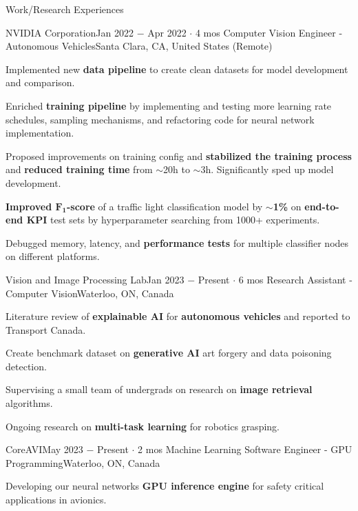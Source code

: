 \documentclass{resume}
\begin{document}
\begin{rSection}{Work/Research Experiences}

    \begin{rSubsection}{NVIDIA Corporation}{Jan 2022 \(-\) Apr 2022 \(\cdot\) 4 mos}
        {Computer Vision Engineer - Autonomous Vehicles}{Santa Clara, CA, United States (Remote)}
        \item Implemented new \textbf{data pipeline} to create clean datasets for model development and comparison.
        \item Enriched \textbf{training pipeline} by implementing and testing more learning rate schedules, sampling mechanisms, and refactoring code for neural network implementation.
        \item Proposed improvements on training config and \textbf{stabilized the training process} and \textbf{reduced training time} from \(\sim\)20h to \(\sim\)3h. Significantly sped up model development.
        \item \textbf{Improved \(\boldsymbol{F_{1}}\)-score} of a traffic light classification model by \(\sim\)\textbf{1\%} on \textbf{end-to-end KPI} test sets by hyperparameter searching from 1000+ experiments.
        \item Debugged memory, latency, and \textbf{performance tests} for multiple classifier nodes on different platforms.
    \end{rSubsection}

    \begin{rSubsection}{Vision and Image Processing Lab}{Jan 2023 \(-\) Present \(\cdot\) 6 mos}
        {Research Assistant - Computer Vision}{Waterloo, ON, Canada}
        \item Literature review of \textbf{explainable AI} for \textbf{autonomous vehicles} and reported to Transport Canada.
        \item Create benchmark dataset on \textbf{generative AI} art forgery and data poisoning detection.
        \item Supervising a small team of undergrads on research on \textbf{image retrieval} algorithms.
        \item Ongoing research on \textbf{multi-task learning} for robotics grasping.
    \end{rSubsection}

    \begin{rSubsection}{CoreAVI}{May 2023 \(-\) Present \(\cdot\) 2 mos}
        {Machine Learning Software Engineer - GPU Programming}{Waterloo, ON, Canada}
        \item Developing our neural networks \textbf{GPU inference engine} for safety critical applications in avionics.
    \end{rSubsection}


\end{rSection}
\end{document}
